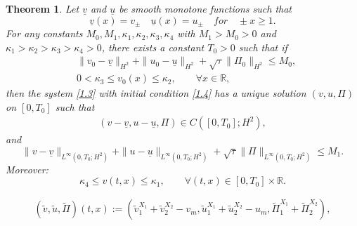 \documentclass[10pt,a4paper]{amsart}
\newtheorem{theorem}{Theorem}
\begin{document}
\begin{theorem}\label{th3.1}
Let $\underline{v}$ and $\underline{u}$ be smooth monotone functions such that
\[
\underline{v}(x)=v_{\pm} \quad \underline{u}(x)=u_{\pm} \quad for \quad \pm x\geq1.
\]
For any constants $M_0,M_1,\kappa_1,\kappa_2,\kappa_3,\kappa_4$ with $M_1>M_0>0$ and $\kappa_1>\kappa_2>\kappa_3>\kappa_4>0$, there exists a constant $T_0>0$ such that if
\[
\begin{aligned}
&\|v_0-\underline{v}\|_{H^2}+\|u_0-\underline{u}\|_{H^2}+\sqrt{\tau}\|\Pi_0\|_{H^2}\leq M_0,\\
&0<\kappa_3\leq v_0(x)\leq\kappa_2,\qquad \forall x\in\mathbb{R},
\end{aligned}
\]
then the system \eqref{1.3} with initial condition \eqref{1.4} has a unique solution $(v, u, \Pi)$ on $[0,T_0]$ such that
\[
\begin{aligned}
(v-\underline{v}, u-\underline{u}, \Pi)\in C([0,T_0];H^2),
\end{aligned}
\]
and
\[
\|v-\underline{v}\|_{L^{\infty}(0,T_0;H^2)}+\|u-\underline{u}\|_{L^{\infty}(0,T_0;H^2)}
+\sqrt{\tau}\|\Pi\|_{L^{\infty}(0,T_0;H^2)}\leq M_1.
\]
Moreover:
\[
\kappa_4\leq v(t,x)\leq\kappa_1,\qquad \forall(t,x)\in[0,T_0]\times\mathbb{R}.
\]
\end{theorem}

\begin{align}\label{3.1}
\left(\widetilde{v}, \widetilde{u}, \widetilde{\Pi}\right)(t, x):=
\left(\widetilde{v}_1^{X_1}+\widetilde{v}_2^{X_2}-v_m,
\widetilde{u}_1^{X_1}+\widetilde{u}_2^{X_2}-u_m,
\widetilde{\Pi}_1^{X_1}+\widetilde{\Pi}_2^{X_2}\right),
\end{align}
\end{document}
